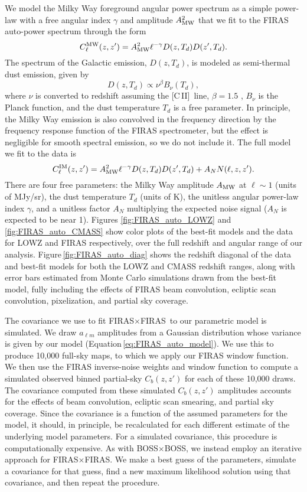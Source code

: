 \documentclass[fleqn,usenatbib]{mnras}
\newcommand{\cii}{[C{\sc\,II}]}
\newcommand{\FF}{FIRAS${\times}$FIRAS}
\newcommand{\BB}{BOSS${\times}$BOSS}
\begin{document}
We model the Milky Way foreground angular power spectrum as a simple power-law with a free angular index $\gamma$ and amplitude $A_{\rm MW}^2$ that we fit to the FIRAS auto-power spectrum through the form
\begin{equation}
C^{\rm MW}_{\ell}(z,z') =   A_{\rm MW}^2 \ell^{-\gamma}D(z,T_d)D(z',T_d).
\end{equation}
The spectrum of the Galactic emission, $D(z,T_d)$, is modeled as semi-thermal dust emission, given by
\begin{equation}
    D(z,T_d) \propto \nu^{\beta} B_{\nu}(T_d), 
\end{equation}
where $\nu$ is converted to redshift assuming the \cii\ line, $\beta = 1.5$ \citep{2014A&A...566A..55P}, $B_{\nu}$ is the Planck function, and the dust temperature $T_d$ is a free parameter. In principle, the Milky Way emission is also convolved in the frequency direction by the frequency response function of the FIRAS spectrometer, but the effect is negligible for smooth spectral emission, so we do not include it. The full model we fit to the data is
\begin{equation}
\label{eq:FIRAS_auto_model}
C^{\rm IM}_\ell(z,z') = A_{\rm MW}^2 \ell^{-\gamma}D(z,T_d)D(z',T_d) + A_N N(\ell, z, z').
\end{equation}
There are four free parameters: the Milky Way amplitude $A_{\rm MW}$ at $\ell\sim1$ (units of MJy/sr), the dust temperature $T_d$ (units of K), the unitless angular power-law index $\gamma$, and a unitless factor $A_N$ multiplying the expected noise signal ($A_N$ is expected to be near 1).
Figures \ref{fig:FIRAS_auto_LOWZ} and \ref{fig:FIRAS_auto_CMASS} show color plots of the best-fit models and the data for LOWZ and FIRAS respectively, over the full redshift and angular range of our analysis. Figure\,\ref{fig:FIRAS_auto_diag} shows the redshift diagonal of the data and best-fit models for both the LOWZ and CMASS redshift ranges, along with error bars estimated from Monte Carlo simulations drawn from the best-fit model, fully including the effects of FIRAS beam convolution, ecliptic scan convolution, pixelization, and partial sky coverage.

The covariance we use to fit \FF\ to our parametric model is simulated. We draw  $a_{\ell m}$ amplitudes from a Gaussian distribution whose variance is given by our model (Equation\,\ref{eq:FIRAS_auto_model}). We use this to produce 10,000 full-sky maps, to which we apply our FIRAS window function. We then use the FIRAS inverse-noise weights and window function to compute a simulated observed binned partial-sky $C_b(z,z')$ for each of these 10,000 draws. The covariance computed from these simulated $C_b(z,z')$ amplitudes accounts for the effects of beam convolution, ecliptic scan smearing, and partial sky coverage.
Since the covariance is a function of the assumed parameters for the model, it should, in principle, be recalculated for each different estimate of the underlying model parameters. For a simulated covariance, this procedure is computationally expensive. As with \BB, we instead employ an iterative approach for \FF. We make a best guess of the parameters, simulate a covariance for that guess, find a new maximum likelihood solution using that covariance, and then repeat the procedure. 
\end{document}
